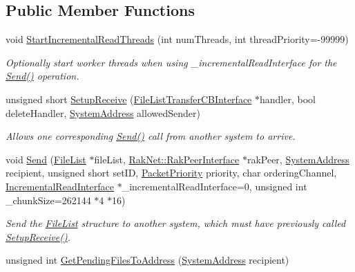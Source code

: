 \subsection*{Public Member Functions}
\begin{DoxyCompactItemize}
\item 
void \hyperlink{class_rak_net_1_1_file_list_transfer_a8c1f54b625bc32b6789e92ff76639527}{Start\-Incremental\-Read\-Threads} (int num\-Threads, int thread\-Priority=-\/99999)
\begin{DoxyCompactList}\small\item\em Optionally start worker threads when using \-\_\-incremental\-Read\-Interface for the \hyperlink{class_rak_net_1_1_file_list_transfer_ae0dd9c15eb9b045a2a912da9772271e2}{Send()} operation. \end{DoxyCompactList}\item 
unsigned short \hyperlink{class_rak_net_1_1_file_list_transfer_afc31c7d166bfb3fb60944624e27ce388}{Setup\-Receive} (\hyperlink{class_rak_net_1_1_file_list_transfer_c_b_interface}{File\-List\-Transfer\-C\-B\-Interface} $\ast$handler, bool delete\-Handler, \hyperlink{struct_rak_net_1_1_system_address}{System\-Address} allowed\-Sender)
\begin{DoxyCompactList}\small\item\em Allows one corresponding \hyperlink{class_rak_net_1_1_file_list_transfer_ae0dd9c15eb9b045a2a912da9772271e2}{Send()} call from another system to arrive. \end{DoxyCompactList}\item 
void \hyperlink{class_rak_net_1_1_file_list_transfer_ae0dd9c15eb9b045a2a912da9772271e2}{Send} (\hyperlink{class_rak_net_1_1_file_list}{File\-List} $\ast$file\-List, \hyperlink{class_rak_net_1_1_rak_peer_interface}{Rak\-Net\-::\-Rak\-Peer\-Interface} $\ast$rak\-Peer, \hyperlink{struct_rak_net_1_1_system_address}{System\-Address} recipient, unsigned short set\-I\-D, \hyperlink{_packet_priority_8h_a659378374e516180f93640c79f59705c}{Packet\-Priority} priority, char ordering\-Channel, \hyperlink{class_rak_net_1_1_incremental_read_interface}{Incremental\-Read\-Interface} $\ast$\-\_\-incremental\-Read\-Interface=0, unsigned int \-\_\-chunk\-Size=262144 $\ast$4 $\ast$16)
\begin{DoxyCompactList}\small\item\em Send the \hyperlink{class_rak_net_1_1_file_list}{File\-List} structure to another system, which must have previously called \hyperlink{class_rak_net_1_1_file_list_transfer_afc31c7d166bfb3fb60944624e27ce388}{Setup\-Receive()}. \end{DoxyCompactList}\item 
\hypertarget{class_rak_net_1_1_file_list_transfer_aa4d7662f9112a282c81b3e5a937e560c}{unsigned int \hyperlink{class_rak_net_1_1_file_list_transfer_aa4d7662f9112a282c81b3e5a937e560c}{Get\-Pending\-Files\-To\-Address} (\hyperlink{struct_rak_net_1_1_system_address}{System\-Address} recipient)}\label{class_rak_net_1_1_file_list_transfer_aa4d7662f9112a282c81b3e5a937e560c}


\end{DoxyCompactItemize}
